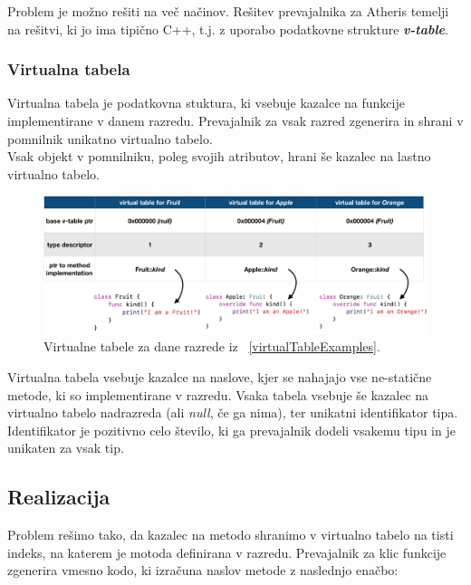 \documentclass[a4paper, 12p]{book}
\begin{document}
\indent Problem je možno rešiti na več načinov. Rešitev prevajalnika za Atheris temelji na rešitvi, ki jo ima tipično C++, t.j. z uporabo podatkovne strukture \textit{\textbf{v-table}}. 

\subsubsection{Virtualna tabela}

Virtualna tabela je podatkovna stuktura, ki vsebuje kazalce na funkcije implementirane v danem razredu. Prevajalnik za vsak razred zgenerira in shrani v pomnilnik unikatno virtualno tabelo. \\
\indent Vsak objekt v pomnilniku, poleg svojih atributov, hrani še kazalec na lastno virtualno tabelo.

\begin{figure}[h]
	\begin{center}
		\includegraphics[width=1.1\textwidth]{resources/vtables.png}
	\end{center}
	\caption{Virtualne tabele za dane razrede iz ~\ref{virtualTableExamples}.}
	\label{vtables}
\end{figure}

Virtualna tabela vsebuje kazalce na naslove, kjer se nahajajo vse ne-statične metode, ki so implementirane v razredu. Vsaka tabela vsebuje še kazalec na virtualno tabelo nadrazreda (ali \textit{null}, če ga nima), ter unikatni identifikator tipa. Identifikator je pozitivno celo število, ki ga prevajalnik dodeli vsakemu tipu in je unikaten za vsak tip. \\

\subsection{Realizacija}

Problem rešimo tako, da kazalec na metodo shranimo v virtualno tabelo na tisti indeks, na katerem je motoda definirana v razredu. Prevajalnik za klic funkcije zgenerira vmesno kodo, ki izračuna naslov metode z naslednjo enačbo:
\end{document}
